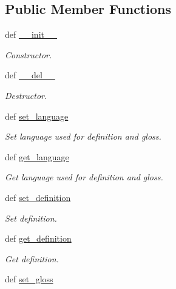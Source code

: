 \subsection*{Public Member Functions}
\begin{DoxyCompactItemize}
\item 
def \hyperlink{classlmf_1_1src_1_1core_1_1definition_1_1_definition_a28cb2d022b2b4f699db74a6e5a904b81}{\+\_\+\+\_\+init\+\_\+\+\_\+}
\begin{DoxyCompactList}\small\item\em Constructor. \end{DoxyCompactList}\item 
def \hyperlink{classlmf_1_1src_1_1core_1_1definition_1_1_definition_a1830dd2170b25276c22d7954cd6f1b22}{\+\_\+\+\_\+del\+\_\+\+\_\+}
\begin{DoxyCompactList}\small\item\em Destructor. \end{DoxyCompactList}\item 
def \hyperlink{classlmf_1_1src_1_1core_1_1definition_1_1_definition_a40bb8bcec281527b669dce59a1f5b707}{set\+\_\+language}
\begin{DoxyCompactList}\small\item\em Set language used for definition and gloss. \end{DoxyCompactList}\item 
def \hyperlink{classlmf_1_1src_1_1core_1_1definition_1_1_definition_a8f75f0e51554d35128744fd27e7abf15}{get\+\_\+language}
\begin{DoxyCompactList}\small\item\em Get language used for definition and gloss. \end{DoxyCompactList}\item 
def \hyperlink{classlmf_1_1src_1_1core_1_1definition_1_1_definition_a959137e9ca1596287761ba0da6c35413}{set\+\_\+definition}
\begin{DoxyCompactList}\small\item\em Set definition. \end{DoxyCompactList}\item 
def \hyperlink{classlmf_1_1src_1_1core_1_1definition_1_1_definition_a68b719a7057c8b99425e7da851ec9ab8}{get\+\_\+definition}
\begin{DoxyCompactList}\small\item\em Get definition. \end{DoxyCompactList}\item 
def \hyperlink{classlmf_1_1src_1_1core_1_1definition_1_1_definition_a4242b74954f73f87b84866cbf9a17cc4}{set\+\_\+gloss}

\end{DoxyCompactItemize}
